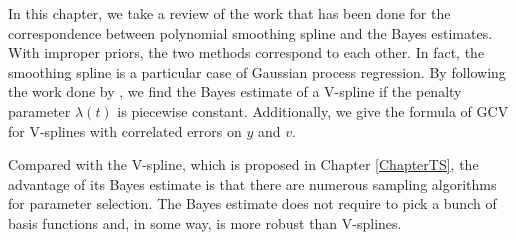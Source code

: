 %
%
%


In this chapter, we take a review of the work that has been done for the correspondence between polynomial smoothing spline and the Bayes estimates. With improper priors, the two methods correspond to each other. In fact, the smoothing spline is a particular case of Gaussian process regression. By following the work done by \cite{gu2013smoothing}, we find the Bayes estimate of a V-spline if the penalty parameter $\lambda(t)$ is piecewise constant. Additionally, we give the formula of GCV for V-splines with correlated errors on $y$ and $v$. 


Compared with the V-spline, which is proposed in Chapter \ref{ChapterTS}, the advantage of its Bayes estimate is that there are numerous sampling algorithms for parameter selection. The Bayes estimate does not require to pick a bunch of basis functions and, in some way, is more robust than V-splines.




